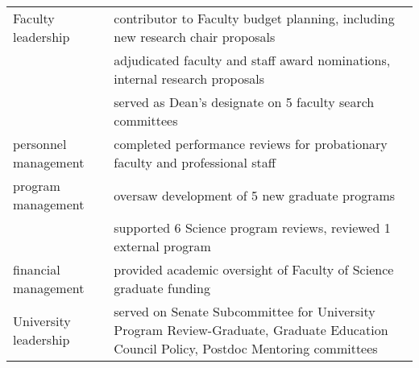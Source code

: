 \begin{tabularx}{\textwidth}{lX}
Faculty leadership & contributor to Faculty  budget planning,  including new research chair proposals \\
& adjudicated faculty and staff award nominations, internal research proposals  \\
& served as Dean's designate on 5 faculty search committees \\
personnel management & completed performance reviews for probationary faculty and professional staff  \\
program management  & oversaw development of 5 new graduate programs \\
& supported 6 Science program reviews, reviewed 1 external program \\
financial management & provided academic oversight of Faculty of Science graduate funding  \\
University leadership &  served on Senate Subcommittee for University Program Review-Graduate, Graduate Education Council Policy, Postdoc Mentoring committees  \\

\end{tabularx}


